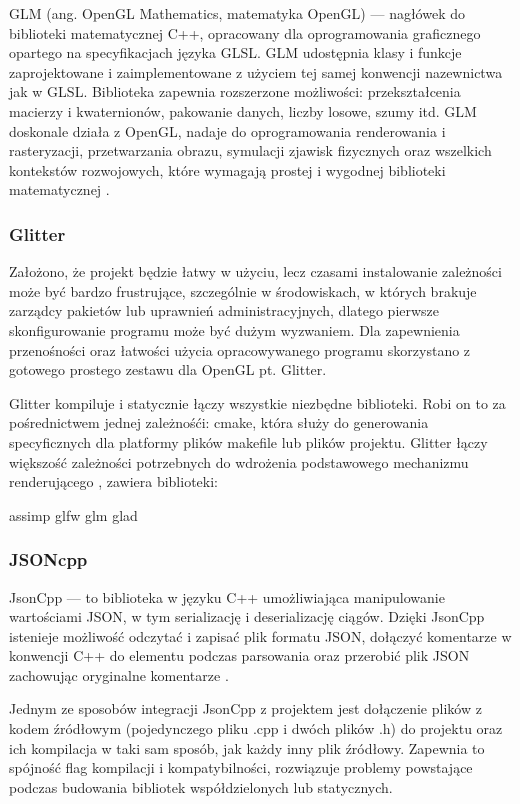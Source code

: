 GLM (ang. OpenGL Mathematics, matematyka OpenGL) --- nagłówek do biblioteki matematycznej C++, opracowany dla oprogramowania graficznego opartego na specyfikacjach języka GLSL. GLM udostępnia klasy i funkcje zaprojektowane i zaimplementowane z użyciem tej samej konwencji nazewnictwa jak w GLSL. Biblioteka zapewnia rozszerzone możliwości: przekształcenia macierzy i kwaternionów, pakowanie danych, liczby losowe, szumy itd. GLM doskonale działa z OpenGL, nadaje do oprogramowania renderowania i rasteryzacji, przetwarzania obrazu, symulacji zjawisk fizycznych oraz wszelkich kontekstów rozwojowych, które wymagają prostej i wygodnej biblioteki matematycznej \cite{glm}. 

\subsubsection{Glitter}
Założono, że projekt będzie łatwy w użyciu, lecz czasami instalowanie zależności może być bardzo frustrujące, szczególnie w środowiskach, w których brakuje zarządcy pakietów lub uprawnień administracyjnych, dlatego pierwsze skonfigurowanie programu może być dużym wyzwaniem.
Dla zapewnienia przenośności oraz łatwości użycia opracowywanego programu skorzystano z gotowego prostego zestawu dla OpenGL pt. Glitter.

Glitter kompiluje i statycznie łączy wszystkie niezbędne biblioteki. Robi on to za pośrednictwem jednej zależnośći: cmake, która służy do generowania specyficznych dla platformy plików makefile lub plików projektu. Glitter łączy większość zależności potrzebnych do wdrożenia podstawowego mechanizmu renderującego \cite{glitter}, zawiera biblioteki:
\begin{itemize}
\itemi assimp
\itemi glfw
\itemi glm
\itemi glad
\end{itemize}

\subsubsection{JSONcpp}
JsonCpp --- to biblioteka w języku C++ umożliwiająca manipulowanie wartościami JSON, w tym serializację i deserializację ciągów. Dzięki JsonCpp istenieje możliwość odczytać i zapisać plik formatu JSON, dołączyć komentarze w konwencji C++ do elementu podczas parsowania oraz przerobić plik JSON zachowując oryginalne komentarze \cite{jsoncpp}.

Jednym ze sposobów integracji JsonCpp z projektem jest dołączenie plików z kodem źródłowym (pojedynczego pliku .cpp i dwóch plików .h) do projektu oraz ich kompilacja w taki sam sposób, jak każdy inny plik źródłowy. Zapewnia to spójność flag kompilacji i kompatybilności, rozwiązuje problemy powstające podczas budowania bibliotek współdzielonych lub statycznych. 

